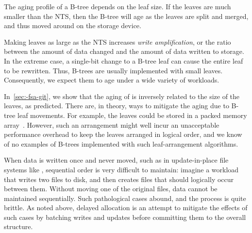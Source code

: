 The aging profile of a B-tree depends on the leaf size.  If the
leaves are much smaller than the NTS, then the
B-tree will age as the leaves are split and merged, and thus moved
around on the storage device.

Making leaves as large as the  NTS increases 
\emph{write amplification}, or the ratio between the
amount of data changed and the amount of data written to storage.  In the extreme
case, a single-bit change to a B-tree leaf can cause the entire leaf
to be rewritten.  Thus, B-trees are usually implemented with small
leaves.  Consequently, we expect them to age under a wide variety of
workloads.

In~\cref{sec:-fsa-git}, we show that the aging of \btrfs is inversely
related to the size of the leaves, as predicted.  There are, in
theory, ways to mitigate the aging due to B-tree leaf movements.  For
example, the leaves could be stored in a packed memory
array~\cite{BenderDeFa05}.  However, such an arrangement might well
incur an unacceptable performance overhead to keep the leaves arranged
in logical order, and we know of no examples of B-trees implemented
with such leaf-arrangement algorithms.


When data is written once and never moved, such as in update-in-place file
systems like \ext, sequential order is very difficult to maintain: imagine a
workload that writes two files to disk, and then creates files that should
logically occur between them. Without moving one of the original files, data
cannot be maintained sequentially.  Such pathological cases abound, and the
process is quite brittle. As noted above, delayed allocation is an attempt to
mitigate the effects of such cases by batching writes and updates before
committing them to the overall structure. 





